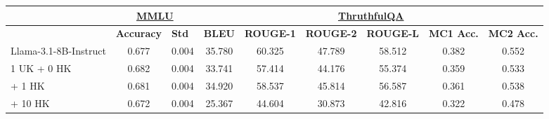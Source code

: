 \begin{table*}[!ht]
    \centering
    \footnotesize
    \setlength{\tabcolsep}{2pt}
\begin{tabular}{l|cc|cccccc}
\toprule
                          & \multicolumn{2}{c|}{{\underline{ MMLU}}}                                            & \multicolumn{6}{c}{{\underline{ ThruthfulQA}}}                                                                                                                                                                                                \\ \midrule
                          & \multicolumn{1}{l}{\textbf{Accuracy}} & \multicolumn{1}{l|}{\textbf{Std}} & \multicolumn{1}{l}{\textbf{BLEU}} & \multicolumn{1}{l}{\textbf{ROUGE-1}} & \multicolumn{1}{l}{\textbf{ROUGE-2}} & \multicolumn{1}{l}{\textbf{ROUGE-L}} & \multicolumn{1}{l}{\textbf{MC1 Acc.}} & \multicolumn{1}{l}{\textbf{MC2 Acc.}} \\ \midrule
Llama-3.1-8B-Instruct     & 0.677                                 & 0.004                                & 35.780                            & 60.325                               & 47.789                               & 58.512                               & 0.382                                & 0.552                                \\ \midrule
\hspace{2.5ex} 1 UK\hspace{1.3ex} + \hspace{3.5ex} 0 HK       & 0.682                                 & 0.004                                & 33.741                            & 57.414                               & 44.176                               & 55.374                               & 0.359                                & 0.533                                \\
\hspace{9.3ex} + \hspace{3.5ex} 1 HK       & 0.681                                 & 0.004                                & 34.920                            & 58.537                               & 45.814                               & 56.587                               & 0.361                                & 0.538                                \\
 \hspace{9.3ex} + \hspace{2.5ex} 10 HK    & 0.672                                 & 0.004                                & 25.367                            & 44.604                               & 30.873                               & 42.816                               & 0.322                                & 0.478                                \\

\end{tabular}
\end{table*}
